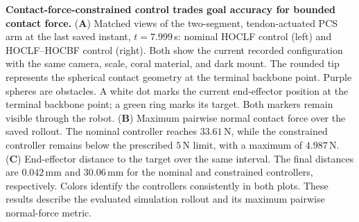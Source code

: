\caption{\textbf{Contact-force-constrained control trades goal accuracy for bounded contact force.}
(\textbf{A}) Matched views of the two-segment, tendon-actuated PCS arm at the
last saved instant, $t=7.999$\,s: nominal HOCLF control (left) and
HOCLF--HOCBF control (right). Both show the current recorded configuration
with the same camera, scale, coral material, and dark mount. The rounded
tip represents the spherical contact geometry at the terminal backbone point. Purple spheres
are obstacles. A white dot marks the current end-effector position at the
terminal backbone point; a green ring marks its target. Both markers remain
visible through the robot.
(\textbf{B}) Maximum pairwise normal contact force over the saved rollout.
The nominal controller reaches $33.61$\,N, while the constrained controller
remains below the prescribed $5$\,N limit, with a maximum of $4.987$\,N.
(\textbf{C}) End-effector distance to the target over the same interval.
The final distances are $0.042$\,mm and $30.06$\,mm for the nominal and
constrained controllers, respectively. Colors identify the
controllers consistently in both plots. These results describe the evaluated
simulation rollout and its maximum pairwise normal-force metric.}
